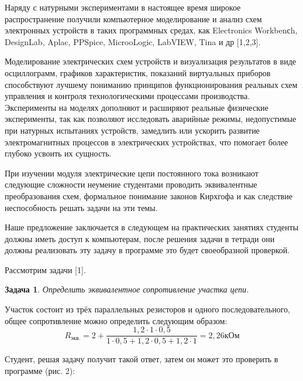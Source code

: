  

\makeProcTitle
{}

Наряду с натурными экспериментами в настоящее время широкое распространение получили компьютерное моделирование и анализ схем электронных устройств в таких программных средах, как Electronics Workbenсh, DesignLab, Aplac, PPSpice, MicrooLogic, LabVIEW, Tina и др [1,2,3].

Моделирование электрических схем устройств и визуализация результатов в виде осциллограмм, графиков характеристик, показаний виртуальных приборов способствуют лучшему пониманию принципов функционирования реальных схем управления и контроля технологическими процессами производства. Эксперименты на моделях дополняют и расширяют реальные физические эксперименты, так как позволяют исследовать аварийные режимы, недопустимые при натурных испытаниях устройств, замедлить или ускорить развитие электромагнитных процессов в электрических устройствах, что помогает более глубоко усвоить их сущность.

При изучении модуля электрические цепи постоянного тока возникают следующие сложности неумение студентами проводить эквивалентные преобразования схем, формальное понимание законов Кирхгофа и как следствие неспособность решать задачи на эти темы.

Наше предложение заключается в следующем на практических занятиях студенты должны иметь доступ к компьютерам, после решения задачи в тетради они должны реализовать эту задачу в программе это будет своеобразной проверкой.

Рассмотрим задачи [1].

\textbf{Задача 1}. \textit{Определить эквивалентное сопротивление участка цепи.}

Участок состоит из трёх параллельных резисторов и одного последовательного, общее сопротивление можно определить следующим образом:
\vspace{-8pt}
$$R_{\text{экв.}}=2+\frac{1,2\cdot1\cdot0,5}{1\cdot0,5+1,2\cdot0,5+1,2\cdot1}=2,26\text{кОм}$$

Студент, решая задачу получит такой ответ, затем он может это проверить в программе (рис. 2):





